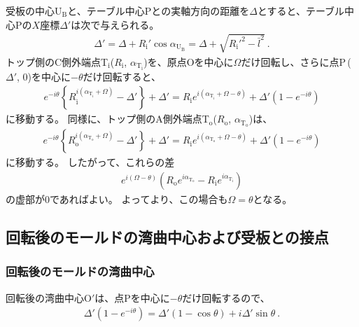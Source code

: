 受板の中心U$_\mathrm B$と、テーブル中心Pとの実軸方向の距離を$\Delta$とすると、テーブル中心Pの$X$座標$\Delta'$は次で与えられる。
\begin{align}
  \label{eq:tableCenter}
  \Delta'
  = \Delta+R_\mathrm i'\cos\alpha_{\mathrm U_\mathrm B} = \Delta+\sqrt{R_\mathrm i'^2-\bar l^2}\ .
\end{align}
トップ側のC側外端点T$_\mathrm i$($R_\mathrm i$, $\alpha_{\mathrm T_\mathrm i}$)を、原点Oを中心に$\Omega$だけ回転し、さらに点P\,($\Delta'$, $0$)を中心に$-\theta$だけ回転すると、
\begin{align}
  \label{eq:afterfttable}
  e^{-i\theta}\left\{R_\mathrm i^{i(\alpha_{\mathrm T_\mathrm i}+\Omega)}-\Delta'\right\}+\Delta'
  = R_\mathrm ie^{i(\alpha_{\mathrm T_\mathrm i}+\Omega-\theta)}+\Delta'\left(1-e^{-i\theta}\right)
\end{align}
に移動する。
同様に、トップ側のA側外端点T$_\mathrm o$($R_\mathrm o$, $\alpha_{\mathrm T_\mathrm o}$)は、
\begin{align*}
  e^{-i\theta}\!\left\{R_\mathrm o^{i(\alpha_{\mathrm T_\mathrm o}+\Omega)}-\Delta'\right\}+\Delta'
  = R_\mathrm ie^{i(\alpha_{\mathrm T_\mathrm o}+\Omega-\theta)}+\Delta'\!\left(1-e^{-i\theta}\right)
\end{align*}
に移動する。
したがって、これらの差
\begin{align*}
  e^{i(\Omega-\theta)}
  \left(R_\mathrm oe^{i\alpha_{\mathrm T_\mathrm o}}-R_\mathrm ie^{i\alpha_{\mathrm T_\mathrm i}}\right)
\end{align*}
の虚部が$0$であればよい。
よってより、この場合も$\Omega = \theta$となる。


\subsection{回転後のモールドの湾曲中心および受板との接点}

\subsubsection{回転後のモールドの湾曲中心}
回転後の湾曲中心O$'$は、点Pを中心に$-\theta$だけ回転するので、
\begin{align*}
  \Delta'\!\left(1-e^{-i\theta}\right) = \Delta'(1-\cos\theta)+i\Delta'\sin\theta\ .
\end{align*}

